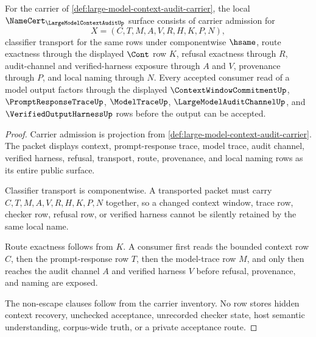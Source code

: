 \begin{theorem}
\label{thm:large-model-context-audit-namecert-obligations}
For the carrier of \autoref{def:large-model-context-audit-carrier}, the local $\NameCert_{\LargeModelContextAuditUp}$ surface consists of carrier admission for
$$
X=(C,T,M,A,V,R,H,K,P,N),
$$
classifier transport for the same rows under componentwise $\hsame$, route exactness through the displayed $\Cont$ row $K$, refusal exactness through $R$, audit-channel and verified-harness exposure through $A$ and $V$, provenance through $P$, and local naming through $N$. Every accepted consumer read of a model output factors through the displayed $\ContextWindowCommitmentUp$, $\PromptResponseTraceUp$, $\ModelTraceUp$, $\LargeModelAuditChannelUp$, and $\VerifiedOutputHarnessUp$ rows before the output can be accepted.
\end{theorem}
\begin{proof}
Carrier admission is projection from \autoref{def:large-model-context-audit-carrier}. The packet displays context, prompt-response trace, model trace, audit channel, verified harness, refusal, transport, route, provenance, and local naming rows as its entire public surface.

Classifier transport is componentwise. A transported packet must carry $C,T,M,A,V,R,H,K,P,N$ together, so a changed context window, trace row, checker row, refusal row, or verified harness cannot be silently retained by the same local name.

Route exactness follows from $K$. A consumer first reads the bounded context row $C$, then the prompt-response row $T$, then the model-trace row $M$, and only then reaches the audit channel $A$ and verified harness $V$ before refusal, provenance, and naming are exposed.

The non-escape clauses follow from the carrier inventory. No row stores hidden context recovery, unchecked acceptance, unrecorded checker state, host semantic understanding, corpus-wide truth, or a private acceptance route.
\end{proof}

